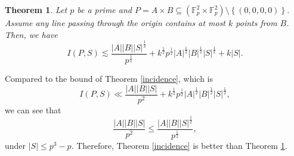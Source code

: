 \documentclass[11pt]{article}
\newtheorem{theorem}{Theorem}[section]
\def\Fbb{\mathbb{F}}
\def\lv{\left\vert}
\def\rv{\right\vert}
\def\lo{\left\{}
\def\ro{\right\}}
\begin{document}
\begin{theorem}\label{thm: 3.8}
    Let $p$ be a prime and $P=A\times B\subseteq (\Fbb_p^2 \times \Fbb_p^2) \setminus \lo (0, 0, 0, 0)\ro $. Assume any line passing through the origin contains at most $k$ points from $B$. Then, we have
    \[ I(P,S) \lesssim   \frac{|A||B|\lv S\rv^{\frac{1}{2}}}{p^{\frac{1}{2}}} + k^{\frac{1}{2}}p^{\frac{1}{2}}|A|^{\frac{1}{2}}|B|^{\frac{1}{2}}\lv S\rv^{\frac{1}{2}} + k\lv S\rv .\]
    
\end{theorem}
Compared to the bound of Theorem \ref{incidence}, which is
\[ I(P,S) \ll \frac{|A||B||S|}{p^2} + k^{\frac{1}{2}}p^{\frac{1}{2}}|A|^{\frac{1}{2}}|B|^{\frac{1}{2}}|S|^{\frac{1}{2}},\]
we can see that
\[ \frac{|A||B||S|}{p^2} \le \frac{|A||B||S|^{\frac{1}{2}}}{p^{\frac{1}{2}}},\]
under $|S|\le p^3-p$.
Therefore, Theorem \ref{incidence} is better than Theorem \ref{thm: 3.8}.
\end{document}
